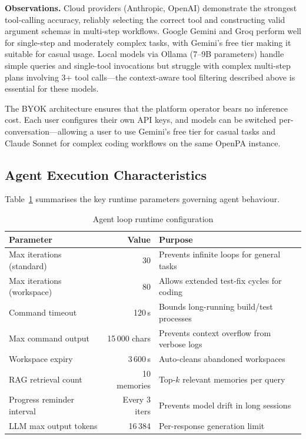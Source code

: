 \textbf{Observations.} Cloud providers (Anthropic, OpenAI) demonstrate the strongest tool-calling accuracy, reliably selecting the correct tool and constructing valid argument schemas in multi-step workflows. Google Gemini and Groq perform well for single-step and moderately complex tasks, with Gemini's free tier making it suitable for casual usage. Local models via Ollama (7--9B parameters) handle simple queries and single-tool invocations but struggle with complex multi-step plans involving 3+ tool calls---the context-aware tool filtering described above is essential for these models.

The BYOK architecture ensures that the platform operator bears no inference cost. Each user configures their own API keys, and models can be switched per-conversation---allowing a user to use Gemini's free tier for casual tasks and Claude Sonnet for complex coding workflows on the same OpenPA instance.

\subsection{Agent Execution Characteristics}

Table~\ref{tab:agentconfig} summarises the key runtime parameters governing agent behaviour.

\begin{table}[H]
\centering
\caption{Agent loop runtime configuration}
\label{tab:agentconfig}
\begin{tabular}{l r l}
\toprule
\textbf{Parameter} & \textbf{Value} & \textbf{Purpose} \\
\midrule
Max iterations (standard)  & 30             & Prevents infinite loops for general tasks \\
Max iterations (workspace) & 80             & Allows extended test-fix cycles for coding \\
Command timeout            & 120\,s         & Bounds long-running build/test processes \\
Max command output          & 15\,000 chars  & Prevents context overflow from verbose logs \\
Workspace expiry           & 3\,600\,s      & Auto-cleans abandoned workspaces \\
RAG retrieval count        & 10 memories    & Top-$k$ relevant memories per query \\
Progress reminder interval & Every 3 iters  & Prevents model drift in long sessions \\
LLM max output tokens      & 16\,384        & Per-response generation limit \\
\bottomrule
\end{tabular}
\end{table}

